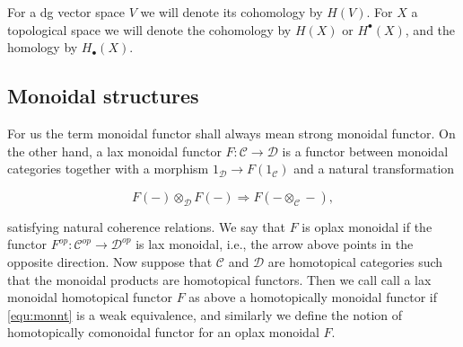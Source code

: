 \documentclass[a4paper]{amsart}
\theoremstyle{plain}
\newtheorem{lemma}[thm]{Lemma}
\theoremstyle{definition}
\newcommand{\dgca}{\mathsf{Dgca}}
\newcommand{\mC}{{\mathcal{C}}}
\newcommand{\mD}{{\mathcal{D}}}
\newcommand{\mF}{\mathcal{F}}
\newcommand{\dgVect}{\mathrm{dgVect}}
\newcommand{\FC}{\mathcal{FC}}
\newcommand{\id}{\mathit{id}}
\newcommand{\beq}[1]{
\begin{equation}\label{#1}
}
\newcommand{\eeq}{
\end{equation}
}
\begin{document}
For a dg vector space $V$ we will denote its cohomology by $H(V)$.
For $X$ a topological space we will denote the cohomology by $H(X)$ or $H^\bullet(X)$, and the homology by $H_\bullet(X)$.

%
%
%


\subsection{Monoidal structures}\label{sec:monoidal definitions}

For us the term monoidal functor shall always mean strong monoidal functor. On the other hand, a lax monoidal functor $F:\mC\to \mD$ is a functor between monoidal categories together with a morphism $1_{\mD} \to F(1_{\mC})$ and a natural transformation 
\beq{equ:monnt}
 F(-)\otimes_{\mD}F(-) \Rightarrow F(-\otimes_{\mC} -), 
\eeq
satisfying natural coherence relations. We say that $F$ is oplax monoidal if the functor $F^{op}:\mC^{op}\to \mD^{op}$ is lax monoidal, i.e., the arrow above points in the opposite direction.
Now suppose that $\mC$ and $\mD$ are homotopical categories such that the monoidal products are homotopical functors.
Then we call call a lax monoidal homotopical functor $F$ as above a homotopically monoidal functor if \eqref{equ:monnt} is a weak equivalence, and similarly we define the notion of homotopically comonoidal functor for an oplax monoidal $F$.
\end{document}
